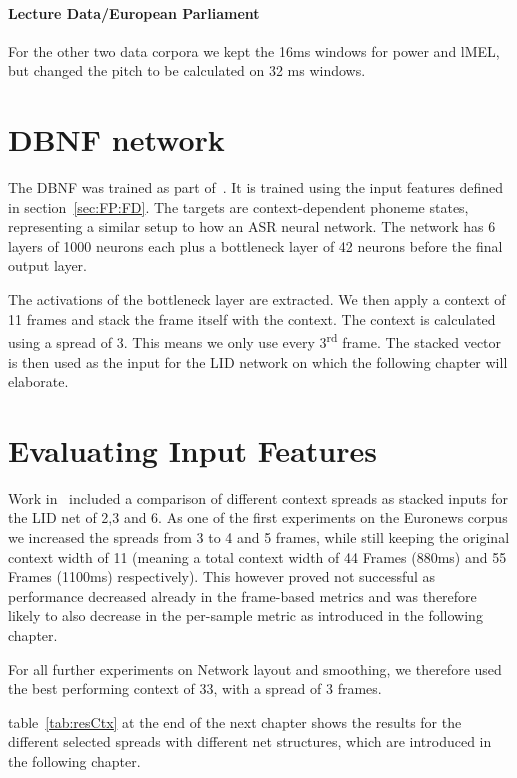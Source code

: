\paragraph{Lecture Data/European Parliament} For the other two data corpora we kept the 16ms windows for power and lMEL, but changed the pitch to be calculated on 32 ms windows.

\section{DBNF network}
\label{sec:FP:Net}

The DBNF was trained as part of~\cite{Mueller2016b}. It is trained using the input features defined in section~\ref{sec:FP:FD}. The targets are context-dependent phoneme states, representing a similar setup to how an ASR neural network. The network has 6 layers of 1000 neurons each plus a bottleneck layer of 42 neurons before the final output layer. 

The activations of the bottleneck layer are extracted. We then apply a context of 11 frames and stack the frame itself with the context. The context is calculated using a spread of 3. This means we only use every 3\textsuperscript{rd} frame. The stacked vector is then used as the input for the LID network on which the following chapter will elaborate. 


\section{Evaluating Input Features}
\label{sec:LIDNetwork:Input}

Work in~\cite{Mueller2016b} included a comparison of different context spreads as stacked inputs for the LID net of 2,3 and 6. As one of the first experiments on the Euronews corpus we increased the spreads from 3 to 4 and 5 frames, while still keeping the original context width of 11 (meaning a total context width of 44 Frames (880ms) and 55 Frames (1100ms) respectively). This however proved not successful as performance decreased already in the frame-based metrics and was therefore likely to also decrease in the per-sample metric as introduced in the following chapter. 

For all further experiments on Network layout and smoothing, we therefore used the best performing context of 33, with a spread of 3 frames.

table~\ref{tab:resCtx} at the end of the next chapter shows the results for the different selected spreads with different net structures, which are introduced in the following chapter.

